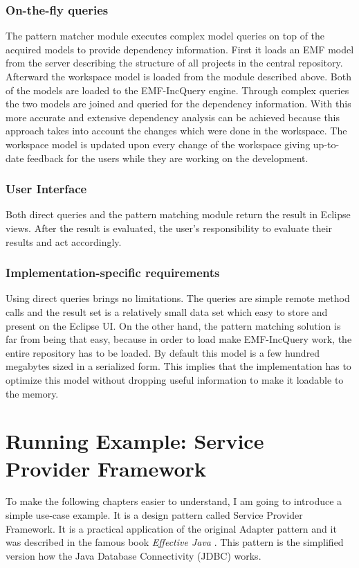 \subsubsection{On-the-fly queries}
The pattern matcher module executes complex model queries on top of the acquired
models to provide dependency information. First it loads an EMF model from the
server describing the structure of all projects in the central repository.
Afterward the workspace model is loaded from the module described above. Both of
the models are loaded to the EMF-IncQuery engine. Through complex queries the two
models are joined and queried for the dependency information. With this more 
accurate and extensive dependency analysis can be achieved because this approach
takes into account the changes which were done in the workspace. The workspace 
model is updated upon every change of the workspace giving up-to-date feedback 
for the users while they are working on the development. 

\subsubsection{User Interface}
Both direct queries and the pattern matching module return the result in Eclipse 
views. After the result is evaluated, the user's responsibility to evaluate their
results and act accordingly.

\subsubsection{Implementation-specific requirements}
Using direct queries brings no limitations. The queries are simple remote method
calls and the result set is a relatively small data set which easy to store and
present on the Eclipse UI. On the other hand, the pattern matching solution is
far from being that easy, because in order to load make EMF-IncQuery work, the
entire repository has to be loaded. By default this model is a few hundred
megabytes sized in a serialized form. This implies that the implementation has to 
optimize this model without dropping useful information to make it loadable to 
the memory.

\section{Running Example: Service Provider Framework}\label{sect:spf}

To make the following chapters easier to understand, I am going to introduce a
simple use-case example. It is a design pattern called Service Provider
Framework. It is a practical application of the original Adapter pattern and it
was described in the famous book \emph{Effective Java} \cite{Bloch08}. This pattern
is the simplified version how the Java Database Connectivity (JDBC) works.

